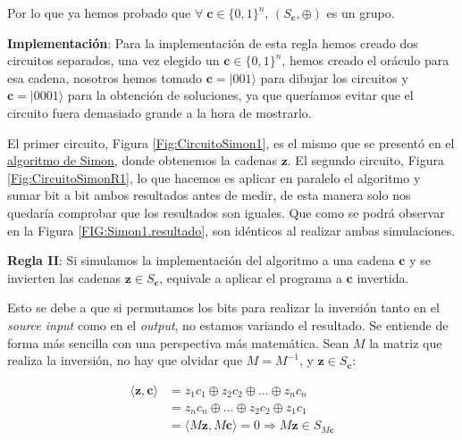  Por lo que ya hemos probado que $\forall\;\mathbf{c}\in \{0,1\}^{n}$, $(S_{\mathbf{c}},\oplus)$ es un grupo.\newline

 \textbf{Implementación}: Para la implementación de esta regla hemos creado dos circuitos separados, una vez elegido un $\mathbf{c}\in \{0,1\}^{n}$, hemos creado el oráculo para esa cadena, nosotros hemos tomado $\mathbf{c}=|001\rangle$ para dibujar los circuitos y $\mathbf{c}=|0001\rangle$ para la obtención de soluciones, ya que queríamos evitar que el circuito fuera demasiado grande a la hora de mostrarlo.\newline

 El primer circuito, Figura \ref{Fig:CircuitoSimon1}, es el mismo que se presentó en el \hyperref[Sec3.5:Simon]{algoritmo de Simon}, donde obtenemos la cadenas $\mathbf{z}$. El segundo circuito, Figura \ref{Fig:CircuitoSimonR1}, lo que hacemos es aplicar en paralelo el algoritmo y sumar bit a bit ambos resultados antes de medir, de esta manera solo nos quedaría comprobar que los resultados son iguales. Que como se podrá observar en la Figura \ref{FIG:Simon1.resultado}, son idénticos al realizar ambas simulaciones.\newline

 
\textbf{Regla II}: Si simulamos la implementación del algoritmo a una cadena $\mathbf{c}$ y se invierten las cadenas $\mathbf{z}\in S_{\mathbf{c}}$, equivale a aplicar el programa a $\mathbf{c}$ invertida.\newline

Esto se debe a que si permutamos los bits para realizar la inversión tanto en el \textit{source input} como en el \textit{output}, no estamos variando el resultado. Se entiende de forma más sencilla con una perspectiva más matemática. Sean $M$ la matriz que realiza la inversión, no hay que olvidar que $M=M^{-1}$, y $\mathbf{z} \in S_{\mathbf{c}}$:

\begin{equation}
    \begin{split}
    \langle \mathbf{z},\mathbf{c} \rangle &= z_{1}c_{1} \oplus z_{2}c_{2} \oplus ...  \oplus z_{n}c_{n} \\ &= z_{n}c_{n} \oplus ... \oplus z_{2}c_{2} \oplus z_{1}c_{1} \\ &= \langle M\mathbf{z}, M\mathbf{c} \rangle = 0 \Rightarrow M\mathbf{z} \in S_{M\mathbf{c}}
    \end{split}
\end{equation}\newline

